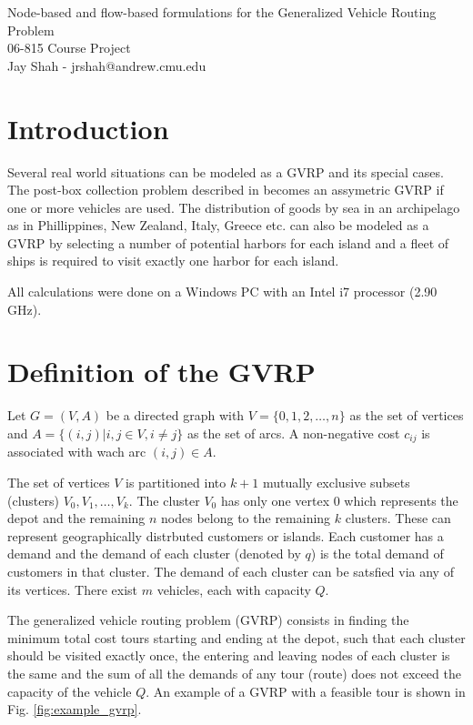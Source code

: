 \documentclass[letterpaper,12pt,onehalfspacing,twoside]{article}
\theoremstyle{msds}
\begin{document}
\pagestyle{plain}

\begingroup  
  \centering
  \LARGE Node-based and flow-based formulations for the Generalized Vehicle Routing Problem
  \\ \large 06-815 Course Project\\
  \large Jay Shah - jrshah@andrew.cmu.edu\par
\endgroup

\section{Introduction}

Several real world situations can be modeled as a GVRP and its special cases. The post-box collection problem described in \citep{Laporte1996} becomes an assymetric GVRP if one or more vehicles are used. The distribution of goods by sea in an archipelago as in Phillippines, New Zealand, Italy, Greece etc. can also be modeled as a GVRP by selecting a number of potential harbors for each island and a fleet of ships is required to visit exactly one harbor for each island.

All calculations were done on a Windows PC with an Intel i7 processor (2.90 GHz).

\section{Definition of the GVRP}

Let $G = (V,A)$ be a directed graph with $V = \{0,1,2,\ldots,n\}$ as the set of vertices and $A = \{(i,j)|i , j \in V , i \ne j\}$ as the set of arcs. A non-negative cost $c_{ij}$ is associated with wach arc $(i,j) \in A$.

The set of vertices $V$ is partitioned into $k + 1$ mutually exclusive subsets (clusters) $V_0, V_1, \ldots, V_k$. The cluster $V_0$ has only one vertex $0$ which represents the depot and the remaining $n$ nodes belong to the remaining $k$ clusters. These can represent geographically distrbuted customers or islands. Each customer has a demand and the demand of each cluster (denoted by $q$) is the total demand of customers in that cluster. The demand of each cluster can be satsfied via any of its vertices. There exist $m$ vehicles, each with capacity $Q$.

The generalized vehicle routing problem (GVRP) consists in finding the minimum total cost tours starting and ending at the depot, such that each cluster should be visited exactly once, the entering and leaving nodes of each cluster is the same and the sum of all the demands of any tour (route) does not exceed the capacity of the vehicle $Q$. An example of a GVRP with a feasible tour is shown in Fig. \ref {fig:example_gvrp}.
\end{document}
